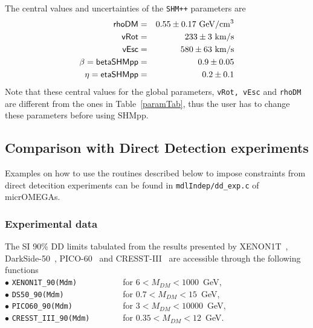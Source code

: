 \documentclass[12pt,a4paper]{article}
\begin{document}
The central values  and uncertainties   of   the {\tt SHM++} parameters are  
\begin{eqnarray}
\nonumber 
\textsf{rhoDM} &=&0.55\pm 0.17 ~{\rm GeV}/{\rm cm}^3\\
\nonumber
\textsf{vRot}&=& 233\pm 3 ~{\rm km/s}\\
\nonumber
\textsf{vEsc}&=& 580\pm 63~ {\rm km/s}\\
\nonumber
 \beta=\textsf{betaSHMpp} &=&0.9\pm 0.05\\
\eta= \textsf{etaSHMpp} &=& 0.2\pm 0.1 
\label{eq:SHMpp} 
\end{eqnarray}
\noindent
Note that these central values for the global parameters, {\tt vRot, vEsc} and {\tt rhoDM}   
are different from  the  ones in Table~\ref{paramTab}, thus the user has  to change these parameters before  using SHMpp.
 






\subsection{ Comparison with Direct Detection experiments} 
\label{DDexp}

Examples on how to use the routines described below to impose constraints from direct detecition experiments  can be found  in \verb|mdlIndep/dd_exp.c| of micrOMEGAs. 
\subsubsection{Experimental data}

The SI 90\%  DD  limits  tabulated from the results presented by  XENON1T~\cite{Aprile:2018dbl}, DarkSide-50~\cite{Agnes:2018ves}, PICO-60~\cite{Amole:2019fdf}  and CRESST-III~\cite{Abdelhameed:2019hmk}  are accessible through  the following functions \\

\noindent
$\bullet$ \verb|XENON1T_90(Mdm)          | for  $ 6 <  M_{DM} < 1000$~GeV, \cite{Aprile:2018dbl}  \\
\noindent
$\bullet$ \verb|DS50_90(Mdm)             | for  $ 0.7 < M_{DM} < 15$~GeV, \cite{Agnes:2018ves}   \\
\noindent
$\bullet$ \verb|PICO60_90(Mdm)           | for  $ 3 < M_{DM} < 10000$~GeV, \cite{Amole:2019fdf}   \\
\noindent
$\bullet$ \verb|CRESST_III_90(Mdm)       |  for $ 0.35 < M_{DM} < 12$~GeV. \cite{Abdelhameed:2019hmk} \\
\end{document}
